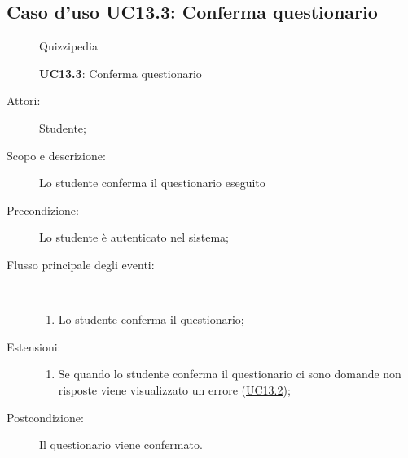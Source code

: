 \subsection{Caso d'uso UC13.3: Conferma questionario}
	\begin{figure}[H]
		\centering
		\begin{resizedtikzpicture}{\textwidth}
		\begin{umlsystem}[x=0, fill=lightgray!20]{Quizzipedia}
		\end{umlsystem}
		\end{resizedtikzpicture}
		\caption{\textbf{UC13.3}: Conferma questionario}
		\label{UC13.3}
	\end{figure}
\begin{description}
\item[Attori:] Studente;
\item[Scopo e descrizione:] Lo studente conferma il questionario eseguito
      \item[Precondizione:] Lo studente è autenticato nel sistema;

        \item[Flusso principale degli eventi:] \ 
 \begin{enumerate}
          \item Lo studente conferma il questionario;

      \end{enumerate}
    \item[Estensioni:]
      \begin{enumerate}
          \item Se quando lo studente conferma il questionario ci sono domande non risposte viene visualizzato un errore (\hyperlink{UC13.2}{UC13.2});

      \end{enumerate}
    \item[Postcondizione:] Il questionario viene confermato.
  \end{description}
\hypertarget{UC13.4}{}
